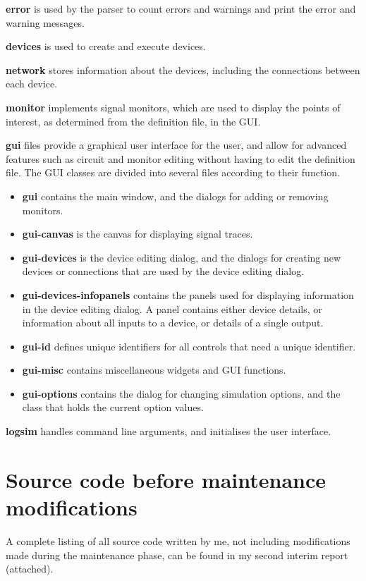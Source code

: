 \documentclass[a4paper,10pt]{article}
\begin{document}
\textbf{error} is used by the parser to count errors and warnings and print the error and warning messages. 

\textbf{devices} is used to create and execute devices. 

\textbf{network} stores information about the devices, including the connections between each device.

\textbf{monitor} implements signal monitors, which are used to display the points of interest, as determined from the definition file, in the GUI.

\textbf{gui} files provide a graphical user interface for the user, and allow for advanced features such as circuit and monitor editing without having to edit the definition file. The GUI classes are divided into several files according to their function. 

\begin{itemize}
 \item \textbf{gui} contains the main window, and the dialogs for adding or removing monitors.
 \item \textbf{gui-canvas} is the canvas for displaying signal traces.
 \item \textbf{gui-devices} is the device editing dialog, and the dialogs for creating new devices or connections that are used by the device editing dialog.
 \item \textbf{gui-devices-infopanels} contains the panels used for displaying information in the device editing dialog. A panel contains either device details, or information about all inputs to a device, or details of a single output.
 \item \textbf{gui-id} defines unique identifiers for all controls that need a unique identifier.
 \item \textbf{gui-misc} contains miscellaneous widgets and GUI functions.
 \item \textbf{gui-options} contains the dialog for changing simulation options, and the class that holds the current option values.
\end{itemize}

\textbf{logsim} handles command line arguments, and initialises the user interface. 


\clearpage
\section{Source code before maintenance modifications}
\label{sec:report2}

A complete listing of all source code written by me, not including modifications made during the maintenance phase, can be found in my second interim report (attached).
\end{document}
